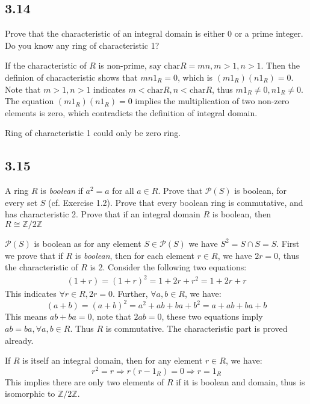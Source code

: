 \documentclass[a4paper, pdf, 12pt]{article}
\makeatletter
\renewenvironment{proof}[1][\proofname]{\par
  \pushQED{\qed}%
  \normalfont \topsep6\p@\@plus6\p@\relax
  \trivlist
  \item[%
    \hskip\labelsep
    \normalfont\bfseries %
    #1%
    \@addpunct{.}%
  ]\ignorespaces
}{%
  \popQED\endtrivlist\@endpefalse
}
\let\qed\relax %
\DeclareRobustCommand{\qed}{%
  \ifmmode \mathqed
  \else
    \leavevmode\unskip\penalty\@M\hbox{}\nobreak\hspace{.5em minus .1em}%
    \hbox{\qedsymbol}%
  \fi
}
\makeatother
\begin{document}
\subsection*{3.14}
Prove that the characteristic of an integral domain is either $0$ or a prime integer. 
Do you know any ring of characteristic 1?
\begin{proof}
  If the characteristic of $R$ is non-prime, say $\mbox{char}R = mn, m>1, n>1$. Then 
  the definion of characteristic shows that $mn1_{R}=0$, which is $(m1_{R})(n1_{R}) = 0$. 
  Note that $m>1, n>1$ indicates $m < \mbox{char}R, n < \mbox{char}R$, thus $m1_{R}\neq 0, 
  n1_{R}\neq 0$. The equation $(m1_{R})(n1_{R})=0$ implies the multiplication of two non-zero 
  elements is zero, which contradicts the definition of integral domain.

  Ring of characteristic 1 could only be zero ring.
\end{proof}

\subsection*{3.15}
A ring $R$ is \textit{boolean} if $a^2= a$ for all $a \in R$. Prove that $\mathscr{P}(S)$ is boolean, 
for every set $S$ 
(cf. Exercise 1.2). Prove that every boolean ring is commutative, and has characteristic 2. 
Prove that if an integral domain $R$ is boolean, then $R \cong \mathbb{Z}/2\mathbb{Z}$
\begin{proof}
  $\mathscr{P}(S)$ is boolean as for any element $S\in \mathscr{P}(S)$ we have $S^{2} = S\cap S=S$.
  First we prove that if $R$ is \textit{boolean}, then for each element $r\in R$, we have $2r=0$, thus 
  the characteristic of $R$ is 2. Consider the following two equations:
  $$
  \begin{aligned}
  (1+r) = (1+r)^{2} = 1+2r+r^{2} = 1+2r + r
  \end{aligned}
  $$
  This indicates $\forall r\in R, 2r=0$. Further, $\forall a,b\in R$, we have:
  $$
  (a+b) = (a+b)^{2} = a^2 + ab + ba + b^{2} = a + ab + ba + b
  $$ This means $ab+ba = 0$, note that $2ab=0$, these two equations imply $ab=ba, \forall a,b\in R$. Thus $R$ is commutative. The 
  characteristic part is proved already. 

  If $R$ is itself an integral domain, then for any element $r\in R$, we have:
  $$
  r^2 = r \Rightarrow r(r-1_{R}) = 0\Rightarrow r = 1_{R}
  $$
  This implies there are only two elements of $R$ if it is boolean and domain, thus is isomorphic to 
  $\mathbb{Z}/2\mathbb{Z}$.
\end{proof}
\end{document}
